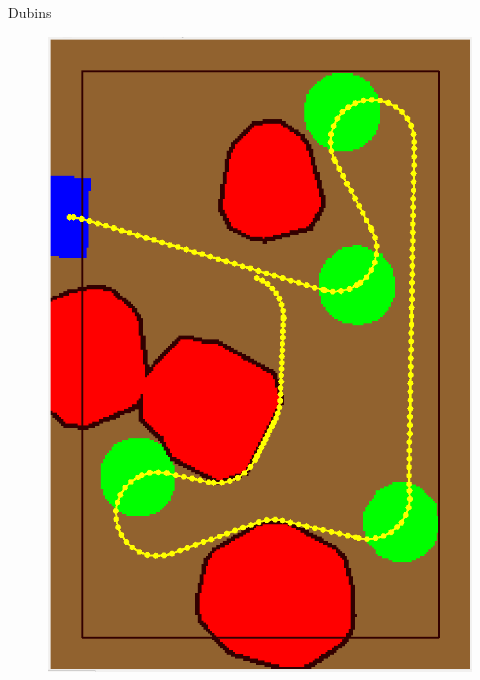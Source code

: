 \begin{frame}[fragile]{Dubins}
\begin{figure}[H]
\begin{minipage}{0.45\linewidth}
		\includegraphics[scale=0.19]{Immagini/map5}
	\end{minipage}
\end{figure}
\end{frame}

